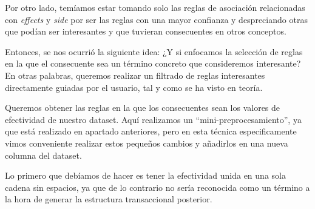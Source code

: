 \documentclass[spanish,]{article}
\newenvironment{Shaded}{\begin{snugshade}}{\end{snugshade}}
\newcommand{\KeywordTok}[1]{\textcolor[rgb]{0.13,0.29,0.53}{\textbf{#1}}}
\newcommand{\StringTok}[1]{\textcolor[rgb]{0.31,0.60,0.02}{#1}}
\newcommand{\CommentTok}[1]{\textcolor[rgb]{0.56,0.35,0.01}{\textit{#1}}}
\newcommand{\OperatorTok}[1]{\textcolor[rgb]{0.81,0.36,0.00}{\textbf{#1}}}
\newcommand{\NormalTok}[1]{#1}
\begin{document}
Por otro lado, temíamos estar tomando solo las reglas de asociación
relacionadas con \emph{effects} y \emph{side} por ser las reglas con una
mayor confianza y despreciando otras que podían ser interesantes y que
tuvieran consecuentes en otros conceptos.

Entonces, se nos ocurrió la siguiente idea: ¿Y si enfocamos la selección
de reglas en la que el consecuente sea un término concreto que
consideremos interesante? En otras palabras, queremos realizar un
filtrado de reglas interesantes directamente guiadas por el usuario, tal
y como se ha visto en teoría.

Queremos obtener las reglas en la que los consecuentes sean los valores
de efectividad de nuestro dataset. Aquí realizamos un
``mini-preprocesamiento'', ya que está realizado en apartado anteriores,
pero en esta técnica especificamente vimos conveniente realizar estos
pequeños cambios y añadirlos en una nueva columna del dataset.

Lo primero que debíamos de hacer es tener la efectividad unida en una
sola cadena sin espacios, ya que de lo contrario no sería reconocida
como un término a la hora de generar la estructura transaccional
posterior.

\begin{Shaded}
\end{Shaded}
\end{document}

